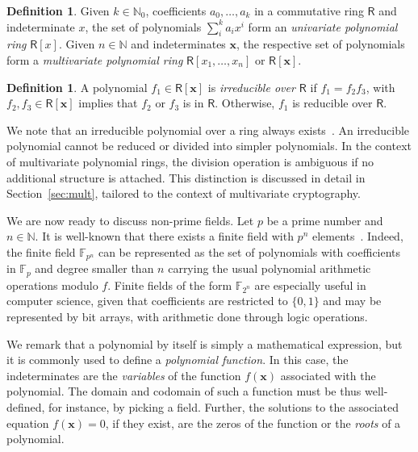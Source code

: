 \documentclass[english]{ufsc-thesis-rn46-2019/ufsc-thesis-rn46-2019}
\theoremstyle{definition}
\newtheorem{definition}[theorem]{Definition}
\begin{document}
\begin{definition}
  Given $k \in \mathbb{N}_{0}$, coefficients $a_{0}, \dots, a_{k}$ in
  a commutative ring $\mathsf{R}$ and indeterminate $x$, the set of polynomials
  $\sum_{i}^{k} a_{i} x^{i}$ form an \emph{univariate polynomial ring}
  $\mathsf{R}[x]$. Given $n \in \mathbb{N}$ and indeterminates $\mathbf{x}$,
  the respective set of polynomials form a \emph{multivariate polynomial ring}
  $\mathsf{R}[x_{1}, \dots, x_{n}]$ or $\mathsf{R}[\mathbf{x}]$.
\end{definition}

\begin{definition}
  A polynomial $f_{1} \in \mathsf{R}[\mathbf{x}]$ is \emph{irreducible over
  $\mathsf{R}$} if $f_{1} = f_{2} f_{3}$, with
  $f_{2}, f_{3} \in \mathsf{R}[\mathbf{x}]$ implies that $f_{2}$ or $f_{3}$ is
  in $\mathsf{R}$. Otherwise, $f_{1}$ is reducible over $\mathsf{R}$.
\end{definition}

We note that an irreducible polynomial over a ring always
exists~\cite[Remark~2.1.25]{Mullen:2013}. An irreducible polynomial cannot be
reduced or divided into simpler polynomials. In the context of multivariate
polynomial rings, the division operation is ambiguous if no additional
structure is attached. This distinction is discussed in detail in
Section~\ref{sec:mult}, tailored to the context of multivariate cryptography.

We are now ready to discuss non-prime fields. Let $p$ be a prime number and
$n \in \mathbb{N}$. It is well-known that there exists a finite field with
$p^{n}$ elements~\cite[Thm.~2.1.32]{Mullen:2013}. Indeed, the finite field
$\mathbb{F}_{p^{n}}$ can be represented as the set of polynomials with
coefficients in $\mathbb{F}_{p}$ and degree smaller than $n$ carrying the usual
polynomial arithmetic operations modulo $f$. Finite fields of the form
$\mathbb{F}_{2^{n}}$ are especially useful in computer science, given that
coefficients are restricted to $\{0, 1\}$ and may be represented by bit arrays,
with arithmetic done through logic operations.

We remark that a polynomial by itself is simply a mathematical expression, but
it is commonly used to define a \emph{polynomial function}. In this case, the
indeterminates are the \emph{variables} of the function $f(\mathbf{x})$
associated with the polynomial. The domain and codomain of such a function must
be thus well-defined, for instance, by picking a field. Further, the solutions
to the associated equation $f(\mathbf{x}) = 0$, if they exist, are the zeros of
the function or the \emph{roots} of a polynomial.
\end{document}
